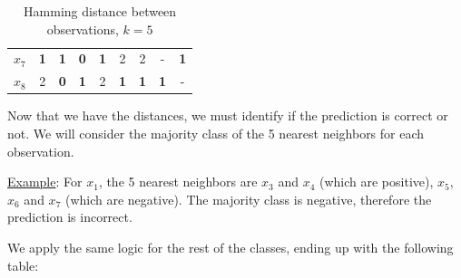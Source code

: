 \documentclass[12pt]{article}
\begin{document}
\begin{enumerate}[leftmargin=\labelsep]
\begin{table}[H]
\begin{center}
\begin{tabular}{c|cccccccc}
                $x_7$ & \textbf{\textcolor{codegreen}{1}} & \textbf{\textcolor{codegreen}{1}} & \textbf{\textcolor{codegreen}{0}} & \textbf{\textcolor{codegreen}{1}} & 2 & 2 & \-- & \textbf{\textcolor{codepink}{1}} \\ 
                $x_8$ & 2 & \textbf{\textcolor{codegreen}{0}} & \textbf{\textcolor{codegreen}{1}} & 2 & \textbf{\textcolor{codepink}{1}} & \textbf{\textcolor{codepink}{1}} & \textbf{\textcolor{codepink}{1}} & \-- \\ 
            \end{tabular}
            \caption{Hamming distance between observations, $k=5$}
        \end{center}
    \end{table}

    Now that we have the distances, we must identify if the prediction is correct or not. We will consider the majority class of the 5 nearest neighbors for each observation.
    
    \vspace{10pt}
    \underline{Example}: For $x_1$, the 5 nearest neighbors are $x_3$ and $x_4$ (which are positive), $x_5$, $x_6$ and $x_7$ (which are negative). The majority class is negative, therefore the prediction is incorrect.
    
    \newpage
    We apply the same logic for the rest of the classes, ending up with the following table:


\end{enumerate}
\end{document}

